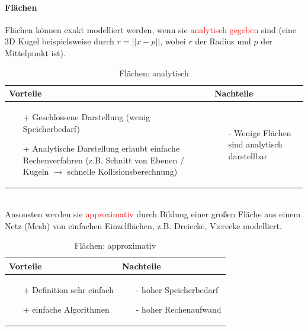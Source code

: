 \paragraph*{Flächen}
Flächen können exakt modelliert werden, wenn sie \textcolor{red}{analytisch gegeben} sind (eine 3D Kugel beispielsweise durch $r = ||x-p||$, wobei $r$ der Radius und $p$ der Mittelpunkt ist).
\begin{table}[hbt]
\centering
\begin{tabular}{|p{6.5cm}|p{6.5cm}|}
\hline
Vorteile & Nachteile\\
\hline
\vspace{-5mm}
\begin{itemize}
\setlength\itemsep{0em}
\item[+] Geschlossene Darstellung (wenig Speicherbedarf)
\item[+] Analytische Darstellung erlaubt einfache Rechenverfahren (z.B.
Schnitt von Ebenen / Kugeln $\rightarrow$ schnelle Kollisionsberechnung)
\end{itemize}
 &
 \vspace{-5mm}
\begin{itemize}
\setlength\itemsep{0em}
\item[-] Wenige Flächen sind analytisch darstellbar
\end{itemize}\\
\hline
\end{tabular}
\caption{Flächen: analytisch}
\label{tab:Flaechen-analyt}
\end{table}\\ 
Ansonsten werden sie \textcolor{red}{approximativ} durch Bildung einer großen Fläche aus einem Netz (\glqq Mesh\grqq ) von einfachen Einzelflächen, z.B. Dreiecke, Vierecke modelliert.\\
\begin{table}[hbt]
\centering
\begin{tabular}{|p{6.5cm}|p{6.5cm}|}
\hline
Vorteile & Nachteile\\
\hline
\vspace{-5mm}
\begin{itemize}
\setlength\itemsep{0em}
\item[+] Definition sehr einfach
\item[+] einfache Algorithmen
\end{itemize}
 &
 \vspace{-5mm}
\begin{itemize}
\setlength\itemsep{0em}
\item[-] hoher Speicherbedarf
\item[-] hoher Rechenaufwand
\end{itemize}\\
\hline
\end{tabular}
\caption{Flächen: approximativ}
\label{tab:Flaechen_approx}
\end{table}\\ 
